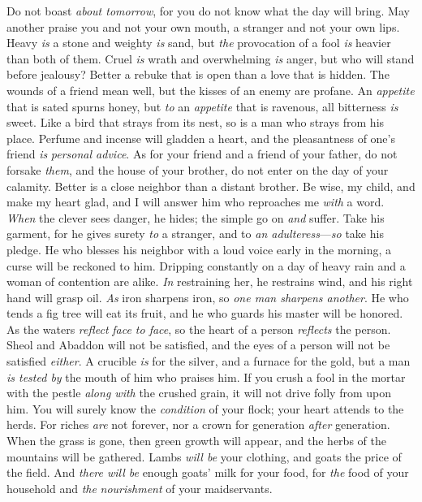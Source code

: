 \begin{biblechapter} %
\verse Do not boast \textit{about tomorrow}, 
for you do not know what the day will bring.
\verse May another praise you and not your own mouth, 
a stranger and not your own lips.
\verse Heavy \textit{is} a stone and weighty \textit{is} sand, 
but \textit{the} provocation of a fool \textit{is} heavier than both of them.
\verse Cruel \textit{is} wrath and overwhelming \textit{is} anger, 
but who will stand before jealousy?
\verse Better a rebuke that is open 
than a love that is hidden.
\verse The wounds of a friend mean well, 
but the kisses of an enemy are profane.
\verse An \textit{appetite} that is sated spurns honey, 
but \textit{to} an \textit{appetite} that is ravenous, all bitterness \textit{is} sweet.
\verse Like a bird that strays from its nest, 
so is a man who strays from his place.
\verse Perfume and incense will gladden a heart, 
and the pleasantness of one’s friend \textit{is} \textit{personal advice}.
\verse As for your friend and a friend of your father, do not forsake \textit{them}, 
and the house of your brother, do not enter on the day of your calamity. 
Better is a close neighbor than a distant brother.
\verse Be wise, my child, and make my heart glad, 
and I will answer him who reproaches me \textit{with} a word.
\verse \textit{When} the clever sees danger, he hides; 
the simple go on \textit{and} suffer.
\verse Take his garment, for he gives surety \textit{to} a stranger, 
and to \textit{an adulteress}—\textit{so} take his pledge.
\verse He who blesses his neighbor with a loud voice 
early in the morning, 
a curse will be reckoned to him.
\verse Dripping constantly on a day of heavy rain 
and a woman of contention are alike.
\verse \textit{In} restraining her, he restrains wind, 
and his right hand will grasp oil.
\verse \textit{As} iron sharpens iron, 
so \textit{one man sharpens another}.
\verse He who tends a fig tree will eat its fruit, 
and he who guards his master will be honored.
\verse As the waters \textit{reflect} \textit{face to face}, 
so the heart of a person \textit{reflects} the person.
\verse Sheol and Abaddon will not be satisfied, 
and the eyes of a person will not be satisfied \textit{either}.
\verse A crucible \textit{is} for the silver, and a furnace for the gold, 
but a man \textit{is tested by} the mouth of him who praises him.
\verse If you crush a fool in the mortar with the pestle \textit{along with} the crushed grain, 
it will not drive folly from upon him.
\verse You will surely know the \textit{condition} of your flock; 
your heart attends to the herds.
\verse For riches \textit{are} not forever, 
nor a crown for generation \textit{after} generation.
\verse When the grass is gone, then green growth will appear, 
and the herbs of the mountains will be gathered.
\verse Lambs \textit{will be} your clothing, 
and goats the price of the field.
\verse And \textit{there will be} enough goats’ milk for your food, 
for \textit{the} food of your household and \textit{the} \textit{nourishment} of your maidservants.
\end{biblechapter}

